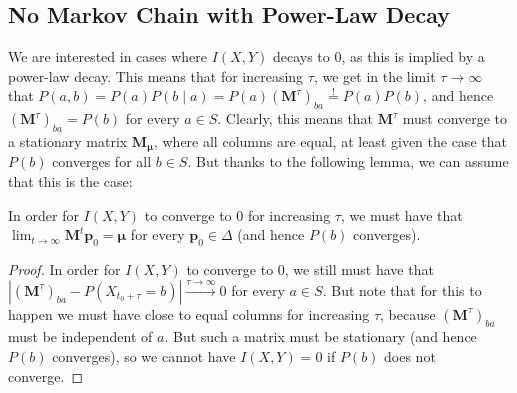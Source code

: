 \documentclass[../../main.tex]{subfiles}
\begin{document}
\subsection{No Markov Chain with Power-Law Decay}
    We are interested in cases where $I(X, Y)$ decays to $0$, as this is implied by a power-law decay. This means that for increasing $\tau$, we get in the limit $\tau \to \infty$ that $P(a, b) = P(a) P(b \mid a) = P(a) (\bm{M}^\tau)_{ba} \overset{!}{=} P(a) P(b)$, and hence $(\bm{M}^\tau)_{ba} = P(b)$ for every $a \in S$. Clearly, this means that $\bm{M}^\tau$ must converge to a stationary matrix $\bm{M_\mu}$, where all columns are equal, at least given the case that $P(b)$ converges for all $b \in S$. But thanks to the following lemma, we can assume that this is the case:

    \begin{lemma}
        In order for $I(X, Y)$ to converge to $0$ for increasing $\tau$, we must have that $\lim_{t \to \infty}\bm{M}^t \bm{p}_0 = \bm{\mu}$ for every $\bm{p}_0 \in \Delta$ (and hence $P(b)$ converges).
    \end{lemma}
    \vspace{-2.5em}
    \begin{proof}
        In order for $I(X, Y)$ to converge to $0$, we still must have that $|(\bm{M}^\tau)_{ba} - P(X_{t_0 + \tau} = b)| \xrightarrow{\tau \to \infty} 0$ for every $a \in S$. But note that for this to happen we must have close to equal columns for increasing $\tau$, because $(\bm{M}^\tau)_{ba}$ must be independent of $a$. But such a matrix must be stationary (and hence $P(b)$ converges), so we cannot have $I(X, Y) = 0$ if $P(b)$ does not converge.
    \end{proof}
\end{document}
